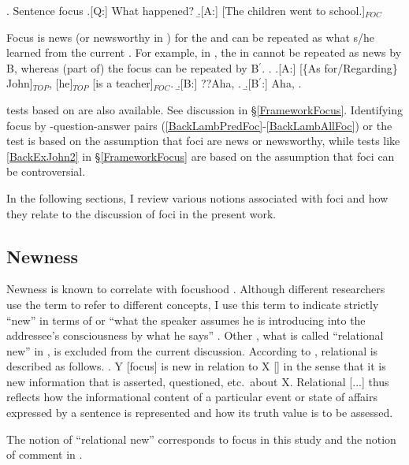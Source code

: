 \ex. \label{BackLambAllFoc}{Sentence focus}
	\a.[Q:] What happened?
	\b.[A:] {[The children went to school.]$_{FOC}$}


Focus is news (or newsworthy in ) for the  and can be repeated as what s/he learned from the current .
For example, in \Next,
the   in \Next[A] cannot be repeated as news by B,
whereas (part of) the focus  can be repeated by B$^{\prime}$.
%
\ex. \a.[A:] [\{As for/Regarding\} John]$_{TOP}$, [he]$_{TOP}$ [is a teacher]$_{FOC}$.
     \b.[B:] ??Aha, .
     \b.[B$^{\prime}$:] Aha, .

 tests based on  are also available.
See discussion in \S \ref{FrameworkFocus}.
Identifying focus by
-question-answer pairs (\ref{BackLambPredFoc}-\ref{BackLambAllFoc}) or the  test \Last
is based on the assumption that
foci are news or newsworthy,
while  tests like \ref{BackExJohn2} in \S \ref{FrameworkFocus} are based on the assumption that
foci can be controversial.

In the following sections,
I review various notions associated with foci
and how they relate to the discussion of foci in the present work.

\subsection{Newness}

Newness is known to correlate with focushood \cite[]{li76,givon83,halliday04}.
Although different researchers use the term  to refer to different concepts,
I use this term to indicate strictly ``new'' in terms of  or ``what the speaker assumes he is introducing into the addressee's consciousness by what he says'' \cite[30]{chafe76}.
Other , what is called ``relational new'' in ,
is excluded from the current discussion.
According to , relational  is described as follows.
%
\ex. Y [focus] is new in relation to X [] in the sense that
     it is new information that is asserted, questioned, etc.~about X.
     Relational [...]  thus reflects how the informational content of a particular event or state of affairs expressed by a sentence is represented and how its truth value is to be assessed.

The notion of ``relational new'' corresponds to focus in this study and the notion of comment in .


